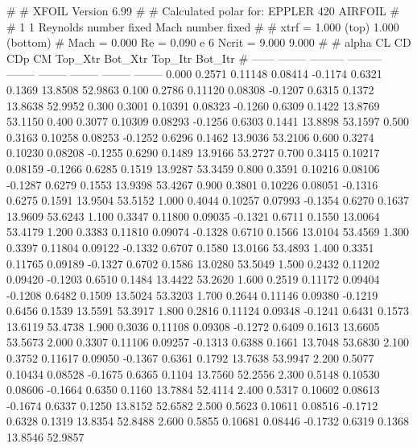 #  
#       XFOIL         Version 6.99
#  
# Calculated polar for: EPPLER 420 AIRFOIL                              
#  
# 1 1 Reynolds number fixed          Mach number fixed         
#  
# xtrf =   1.000 (top)        1.000 (bottom)  
# Mach =   0.000     Re =     0.090 e 6     Ncrit =   9.000  9.000
#  
#   alpha    CL        CD       CDp       CM     Top_Xtr  Bot_Xtr  Top_Itr  Bot_Itr
#  ------ -------- --------- --------- -------- -------- -------- -------- --------
   0.000   0.2571   0.11148   0.08414  -0.1174   0.6321   0.1369  13.8508  52.9863
   0.100   0.2786   0.11120   0.08308  -0.1207   0.6315   0.1372  13.8638  52.9952
   0.300   0.3001   0.10391   0.08323  -0.1260   0.6309   0.1422  13.8769  53.1150
   0.400   0.3077   0.10309   0.08293  -0.1256   0.6303   0.1441  13.8898  53.1597
   0.500   0.3163   0.10258   0.08253  -0.1252   0.6296   0.1462  13.9036  53.2106
   0.600   0.3274   0.10230   0.08208  -0.1255   0.6290   0.1489  13.9166  53.2727
   0.700   0.3415   0.10217   0.08159  -0.1266   0.6285   0.1519  13.9287  53.3459
   0.800   0.3591   0.10216   0.08106  -0.1287   0.6279   0.1553  13.9398  53.4267
   0.900   0.3801   0.10226   0.08051  -0.1316   0.6275   0.1591  13.9504  53.5152
   1.000   0.4044   0.10257   0.07993  -0.1354   0.6270   0.1637  13.9609  53.6243
   1.100   0.3347   0.11800   0.09035  -0.1321   0.6711   0.1550  13.0064  53.4179
   1.200   0.3383   0.11810   0.09074  -0.1328   0.6710   0.1566  13.0104  53.4569
   1.300   0.3397   0.11804   0.09122  -0.1332   0.6707   0.1580  13.0166  53.4893
   1.400   0.3351   0.11765   0.09189  -0.1327   0.6702   0.1586  13.0280  53.5049
   1.500   0.2432   0.11202   0.09420  -0.1203   0.6510   0.1484  13.4422  53.2620
   1.600   0.2519   0.11172   0.09404  -0.1208   0.6482   0.1509  13.5024  53.3203
   1.700   0.2644   0.11146   0.09380  -0.1219   0.6456   0.1539  13.5591  53.3917
   1.800   0.2816   0.11124   0.09348  -0.1241   0.6431   0.1573  13.6119  53.4738
   1.900   0.3036   0.11108   0.09308  -0.1272   0.6409   0.1613  13.6605  53.5673
   2.000   0.3307   0.11106   0.09257  -0.1313   0.6388   0.1661  13.7048  53.6830
   2.100   0.3752   0.11617   0.09050  -0.1367   0.6361   0.1792  13.7638  53.9947
   2.200   0.5077   0.10434   0.08528  -0.1675   0.6365   0.1104  13.7560  52.2556
   2.300   0.5148   0.10530   0.08606  -0.1664   0.6350   0.1160  13.7884  52.4114
   2.400   0.5317   0.10602   0.08613  -0.1674   0.6337   0.1250  13.8152  52.6582
   2.500   0.5623   0.10611   0.08516  -0.1712   0.6328   0.1319  13.8354  52.8488
   2.600   0.5855   0.10681   0.08446  -0.1732   0.6319   0.1368  13.8546  52.9857
